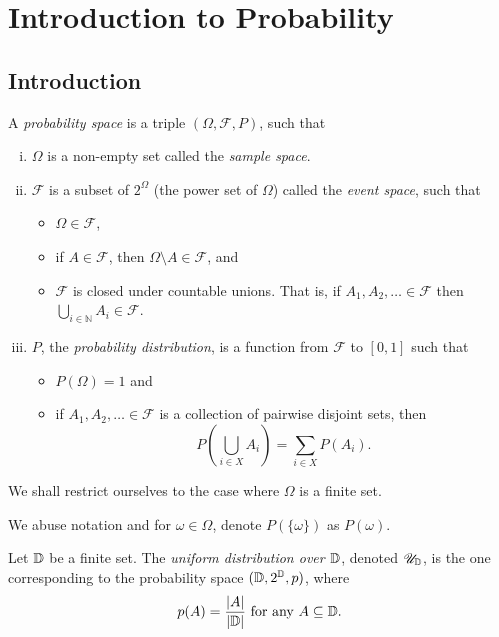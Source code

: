 \section{Introduction to Probability}

\subsection{Introduction}

\begin{definition}
    A \textit{probability space} is a triple $(\Omega,\mathcal{F},P)$, such that
    \begin{enumerate}[(i)]
        \item $\Omega$ is a non-empty set called the \textit{sample space}.
        \item $\mathcal{F}$ is a subset of $2^\Omega$ (the power set of $\Omega$) called the \textit{event space}, such that
        \begin{itemize}
            \item $\Omega\in\mathcal{F}$,
            \item if $A\in\mathcal{F}$, then $\Omega\setminus A\in\mathcal{F}$, and
            \item $\mathcal{F}$ is closed under countable unions. That is, if $A_1,A_2,\ldots\in \mathcal{F}$ then $\bigcup_{i\in\mathbb{N}} A_i\in\mathcal{F}$.
        \end{itemize}
        \item $P$, the \textit{probability distribution}, is a function from $\mathcal{F}$ to $[0,1]$ such that
        \begin{itemize}
            \item $P(\Omega)=1$ and
            \item if $A_1,A_2,\ldots\in\mathcal{F}$ is a collection of pairwise disjoint sets, then
            $$P\left(\bigcup_{i\in X}A_i\right)=\sum_{i\in X}P(A_i).$$
        \end{itemize}
    \end{enumerate}
\end{definition}

We shall restrict ourselves to the case where $\Omega$ is a finite set.

We abuse notation and for $\omega\in\Omega$, denote $P(\{\omega\})$ as $P(\omega)$.

\begin{definition}
    Let $\mathbb{D}$ be a finite set. The \textit{uniform distribution over $\mathbb{D}$}, denoted $\mathscr{U}_{\mathbb{D}}$, is the one corresponding to the probability space $(\mathbb{D},2^{\mathbb{D}},p)$, where $$p(A)=\frac{|A|}{|\mathbb{D}|}\text{ for any } A\subseteq\mathbb{D}.$$
\end{definition}

